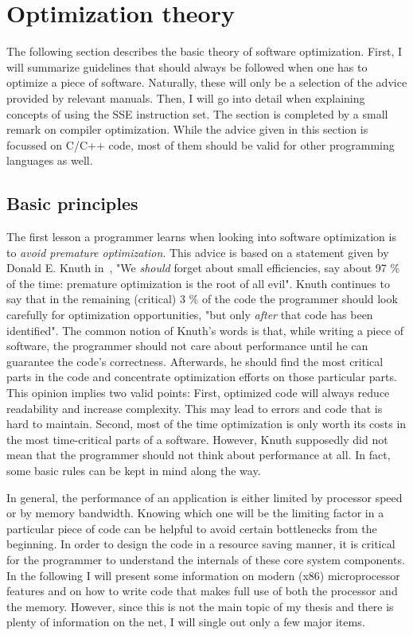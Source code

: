 \section{Optimization theory}
\label{Optimization_theory}
The following section describes the basic theory of software optimization. First, I will summarize guidelines that should always be followed when one has to optimize a piece of software. Naturally, these will only be a selection of the advice provided by relevant manuals. Then, I will go into detail when explaining concepts of using the SSE instruction set. The section is completed by a small remark on compiler optimization. While the advice given in this section is focussed on C/C++ code, most of them should be valid for other programming languages as well.

\subsection{Basic principles}
The first lesson a programmer learns when looking into software optimization is to \emph{avoid premature optimization}. This advice is based on a statement given by Donald E. Knuth in~\cite{knuth1974}, "We \emph{should} forget about small efficiencies, say about 97 \% of the time: premature optimization is the root of all evil". Knuth continues to say that in the remaining (critical) 3 \% of the code the programmer should look carefully for optimization opportunities, "but only \emph{after} that code has been identified". The common notion of Knuth's words is that, while writing a piece of software, the programmer should not care about performance until he can guarantee the code's correctness. Afterwards, he should find the most critical parts in the code and concentrate optimization efforts on those particular parts. This opinion implies two valid points: First, optimized code will always reduce readability and increase complexity. This may lead to errors and code that is hard to maintain. Second, most of the time optimization is only worth its costs in the most time-critical parts of a software. However, Knuth supposedly did not mean that the programmer should not think about performance at all. In fact, some basic rules can be kept in mind along the way. 

In general, the performance of an application is either limited by processor speed or by memory bandwidth. Knowing which one will be the limiting factor in a particular piece of code can be helpful to avoid certain bottlenecks from the beginning. In order to design the code in a resource saving manner, it is critical for the programmer to understand the internals of these core system components. In the following I will present some information on modern (x86) microprocessor features and on how to write code that makes full use of both the processor and the memory. However, since this is not the main topic of my thesis and there is plenty of information on the net, I will single out only a few major items.


